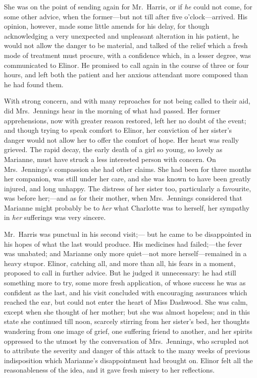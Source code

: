She was on the point of sending again for Mr.\ Harris,
or if \emph{he} could not come, for some other advice,
when the former---but not till after five o'clock---arrived.
His opinion, however, made some little amends for his delay,
for though acknowledging a very unexpected and unpleasant
alteration in his patient, he would not allow the danger
to be material, and talked of the relief which a fresh
mode of treatment must procure, with a confidence which,
in a lesser degree, was communicated to Elinor.  He promised
to call again in the course of three or four hours,
and left both the patient and her anxious attendant more
composed than he had found them.

With strong concern, and with many reproaches for not
being called to their aid, did Mrs.\ Jennings hear in the
morning of what had passed.  Her former apprehensions,
now with greater reason restored, left her no doubt of
the event; and though trying to speak comfort to Elinor,
her conviction of her sister's danger would not allow her
to offer the comfort of hope.  Her heart was really grieved.
The rapid decay, the early death of a girl so young,
so lovely as Marianne, must have struck a less interested
person with concern.  On Mrs.\ Jennings's compassion
she had other claims.  She had been for three months
her companion, was still under her care, and she was
known to have been greatly injured, and long unhappy.
The distress of her sister too, particularly a favourite,
was before her;---and as for their mother, when Mrs.\ Jennings
considered that Marianne might probably be to \emph{her} what
Charlotte was to herself, her sympathy in \emph{her} sufferings
was very sincere.

Mr.\ Harris was punctual in his second visit;---%
but he came to be disappointed in his hopes of what the
last would produce.  His medicines had failed;---the fever
was unabated; and Marianne only more quiet---not more
herself---remained in a heavy stupor.  Elinor, catching all,
and more than all, his fears in a moment, proposed to call
in further advice.  But he judged it unnecessary: he had
still something more to try, some more fresh application,
of whose success he was as confident as the last, and his
visit concluded with encouraging assurances which reached
the ear, but could not enter the heart of Miss Dashwood.
She was calm, except when she thought of her mother;
but she was almost hopeless; and in this state she continued
till noon, scarcely stirring from her sister's bed,
her thoughts wandering from one image of grief,
one suffering friend to another, and her spirits oppressed
to the utmost by the conversation of Mrs.\ Jennings,
who scrupled not to attribute the severity and danger
of this attack to the many weeks of previous indisposition
which Marianne's disappointment had brought on.
Elinor felt all the reasonableness of the idea, and it
gave fresh misery to her reflections.

